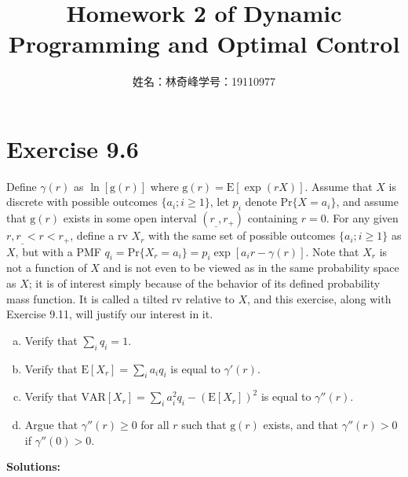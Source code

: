 \documentclass{article}
\begin{document}
    \title{Homework 2 of Dynamic Programming and Optimal Control}
    \author{姓名：林奇峰\qquad 学号：19110977}
    \maketitle

    \section{Exercise 9.6}
    Define $\gamma(r)$ as $\ln[\text{g}(r)]$ where $\text{g}(r)=\text{E}[\exp(rX)]$. Assume that $X$ is discrete with possible outcomes $\{a_i;i\geq1\}$, let $p_i$ denote $\text{Pr}\{X=a_i\}$, and assume that $\text{g}(r)$ exists in some open interval $(r_\_,r_+)$ containing $r=0$. For any given $r,r_\_<r<r_+$, define a rv $X_r$ with the same set of possible outcomes $\{a_i;i\geq1\}$ as $X$, but with a PMF $q_i=\text{Pr}\{X_r=a_i\}=p_i\exp[a_ir-\gamma(r)]$. Note that $X_r$ is not a function of $X$ and is not even to be viewed as in the same probability space as $X$; it is of interest simply because of the behavior of its defined probability mass function. It is called a tilted rv relative to $X$, and this exercise, along with Exercise 9.11, will justify our interest in it.
    \begin{enumerate}[(a)]
        \item Verify that $\sum_iq_i=1$.
        \item Verify that $\text{E}[X_r]=\sum_ia_iq_i$ is equal to $\gamma'(r)$.
        \item Verify that $\text{VAR}[X_r]=\sum_ia_i^2q_i-(\text{E}[X_r])^2$ is equal to $\gamma''(r)$.
        \item Argue that $\gamma''(r)\geq0$ for all $r$ such that $\text{g}(r)$ exists, and that $\gamma''(r)>0$ if $\gamma''(0)>0$.
    \end{enumerate}
    \textbf{Solutions:}
\end{document}
